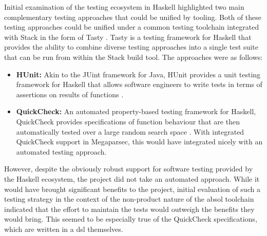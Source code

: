 Initial examination of the testing ecosystem in Haskell highlighted two main complementary testing approaches that could be unified by tooling.
Both of these testing approaches could be unified under a common testing toolchain integrated with Stack in the form of Tasty \citep{tasty_haskell}. 
Tasty is a testing framework for Haskell that provides the ability to combine diverse testing approaches into a single test suite that can be run from within the Stack build tool. 
The approaches were as follows:
\begin{itemize}
    \item \textbf{HUnit:} Akin to the JUint framework for Java, HUnit provides a unit testing framework for Haskell that allows software engineers to write tests in terms of assertions on results of functions \citep{hunit}.
    \item \textbf{QuickCheck:} An automated property-based testing framework for Haskell, QuickCheck provides specifications of function behaviour that are then automatically tested over a large random search space \citep{quick_check}.
    With integrated QuickCheck support in Megaparsec, this would have integrated nicely with an automated testing approach.
\end{itemize}

However, despite the obviously robust support for software testing provided by the Haskell ecosystem, the project did not take an automated approach.
While it would have brought significant benefits to the project, initial evaluation of such a testing strategy in the context of the non-product nature of the \gls{absol} toolchain indicated that the effort to maintain the tests would outweigh the benefits they would bring.
This seemed to be especially true of the QuickCheck specifications, which are written in a \gls{dsl} themselves. \\

